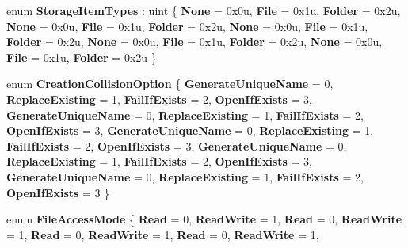 \begin{DoxyCompactItemize}
\mbox{\label{namespace_windows_1_1_storage_afbbba3be392001933e27301572dd9adc}} 
enum {\bfseries Storage\+Item\+Types} \+: uint \{ \newline
{\bfseries None} = 0x0u, 
{\bfseries File} = 0x1u, 
{\bfseries Folder} = 0x2u, 
{\bfseries None} = 0x0u, 
\newline
{\bfseries File} = 0x1u, 
{\bfseries Folder} = 0x2u, 
{\bfseries None} = 0x0u, 
{\bfseries File} = 0x1u, 
\newline
{\bfseries Folder} = 0x2u, 
{\bfseries None} = 0x0u, 
{\bfseries File} = 0x1u, 
{\bfseries Folder} = 0x2u, 
\newline
{\bfseries None} = 0x0u, 
{\bfseries File} = 0x1u, 
{\bfseries Folder} = 0x2u
 \}
\item 
\mbox{\label{namespace_windows_1_1_storage_a47f58c5ed62127e58f4cd3b2e14d0bfb}} 
enum {\bfseries Creation\+Collision\+Option} \{ \newline
{\bfseries Generate\+Unique\+Name} = 0, 
{\bfseries Replace\+Existing} = 1, 
{\bfseries Fail\+If\+Exists} = 2, 
{\bfseries Open\+If\+Exists} = 3, 
\newline
{\bfseries Generate\+Unique\+Name} = 0, 
{\bfseries Replace\+Existing} = 1, 
{\bfseries Fail\+If\+Exists} = 2, 
{\bfseries Open\+If\+Exists} = 3, 
\newline
{\bfseries Generate\+Unique\+Name} = 0, 
{\bfseries Replace\+Existing} = 1, 
{\bfseries Fail\+If\+Exists} = 2, 
{\bfseries Open\+If\+Exists} = 3, 
\newline
{\bfseries Generate\+Unique\+Name} = 0, 
{\bfseries Replace\+Existing} = 1, 
{\bfseries Fail\+If\+Exists} = 2, 
{\bfseries Open\+If\+Exists} = 3, 
\newline
{\bfseries Generate\+Unique\+Name} = 0, 
{\bfseries Replace\+Existing} = 1, 
{\bfseries Fail\+If\+Exists} = 2, 
{\bfseries Open\+If\+Exists} = 3
 \}
\item 
\mbox{\label{namespace_windows_1_1_storage_a5692c3d5d5dc5255f90f05e0a6c3ae9e}} 
enum {\bfseries File\+Access\+Mode} \{ \newline
{\bfseries Read} = 0, 
{\bfseries Read\+Write} = 1, 
{\bfseries Read} = 0, 
{\bfseries Read\+Write} = 1, 
\newline
{\bfseries Read} = 0, 
{\bfseries Read\+Write} = 1, 
{\bfseries Read} = 0, 
{\bfseries Read\+Write} = 1, 
\newline

\end{DoxyCompactItemize}
